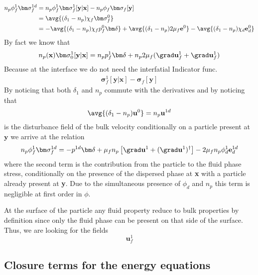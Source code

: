 \begin{align*}
    n_p \phi_f^1 \bm\sigma_f^{1d} 
    &= 
    n_p \phi_f^1 \bm\sigma_f^{1}[\textbf{y}|\textbf{x}] 
    - n_p \phi_f \bm\sigma_f[\textbf{y}]\\
    &= \avg{(\delta_1 - n_p)\chi_f \bm\sigma_f^0}\\
    &= - \avg{(\delta_1 - n_p) \chi_f p_f^0 \bm\delta}
    + \avg{(\delta_1 - n_p)2\mu_f \textbf{e}^0}
    - \avg{(\delta_1 - n_p)\chi_d \textbf{e}_d^0}
\end{align*}
By fact we know that 
\begin{equation*}
    n_p(\textbf{x})\bm\sigma^1_0 [\textbf{y}|\textbf{x}]
    = 
    n_p p_f^1 \bm\delta
    +n_p 2 \mu_f (\grad \textbf{u}_f^1 + \grad \textbf{u}_f^1)
\end{equation*}
Because at the interface we do not need the interfatial Indicator func. 
\begin{align*}
    \bm\sigma_f^{1}[\textbf{y}|\textbf{x}] 
    - \bm\sigma_f[\textbf{y}]
\end{align*}
By noticing that both $\delta_1$ and $n_p$ commute with the derivatives and by noticing that  
\begin{equation*}
    \avg{(\delta_1 - n_p)  \textbf{u}^0}
    = 
    n_p \textbf{u}^{1d}
\end{equation*}
is the disturbance field of the bulk velocity conditionally on a particle present at $\textbf{y}$ we arrive at the relation 
\begin{align*}
    n_p \phi_f^1 \bm\sigma_f^{1d} = 
    - p^{1d} \bm\delta 
    + \mu_f n_p \left[\grad \textbf{u}^1 + (\grad \textbf{u}^1)^\dagger\right]
    - 2 \mu_f n_p \phi_d^1 \textbf{e}_d^{1d}
\end{align*}
where the second term is the contribution from the particle to the fluid phase stress, conditionally on the presence of the dispersed phase at \textbf{x} with a particle already present at \textbf{y}. 
Due to the simultaneous presence of $\phi_d$ and $n_p$ this term is negligible at first order in $\phi$. 

At the surface of the particle any fluid property reduce to bulk properties by definition since only the fluid phase can be present on that side of the surface. 
Thus, we are looking for the fields 
\begin{equation*}
    \textbf{u}_f^1 
\end{equation*}

\subsection{Closure terms for the energy equations}
